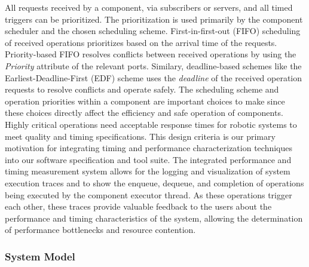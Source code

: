 All requests received by a component, via subscribers or servers, and
all timed triggers can be prioritized. The prioritization is used
primarily by the component scheduler and the chosen scheduling
scheme. First-in-first-out (FIFO) scheduling of received operations
prioritizes based on the arrival time of the requests. Priority-based
FIFO resolves conflicts between received operations by using the
\emph{Priority} attribute of the relevant ports. Similary,
deadline-based schemes like the Earliest-Deadline-First (EDF) scheme
uses the \emph{deadline} of the received operation requests to resolve
conflicts and operate safely. The scheduling scheme and operation
priorities within a component are important choices to make since
these choices directly affect the efficiency and safe operation of
components. Highly critical operations need acceptable response times
for robotic systems to meet quality and timing specifications. This
design criteria is our primary motivation for integrating timing and
performance characterization techniques into our software
specification and tool suite.  The integrated performance and timing
measurement system allows for the logging and visualization of system
execution traces and to show the enqueue, dequeue, and completion of
operations being executed by the component executor thread.  As these
operations trigger each other, these traces provide valuable feedback
to the users about the performance and timing characteristics of the
system, allowing the determination of performance bottlenecks and
resource contention.

\subsubsection{System Model} 


